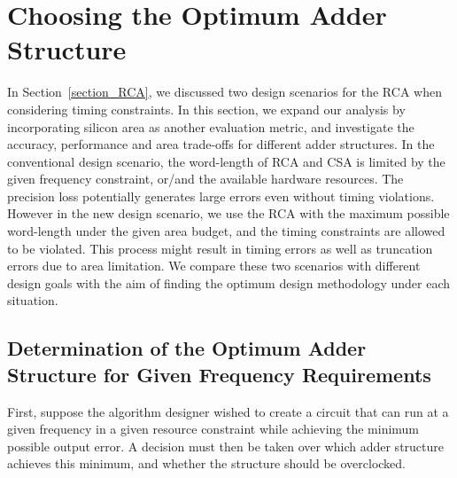\documentclass[prodmode,acmtrets]{acmsmall} %
\begin{document}
\section{Choosing the Optimum Adder Structure}\label{Section_OptimumAdder}
In Section~\ref{section_RCA}, we discussed two design scenarios for the RCA when considering timing constraints. In this section, we expand our analysis by incorporating silicon area as another evaluation metric, and investigate the accuracy, performance and area trade-offs for different adder structures. In the conventional design scenario, the word-length of RCA and CSA is limited by the given frequency constraint, or/and the available hardware resources. The precision loss potentially generates large errors even without timing violations. However in the new design scenario, we use the RCA with the maximum possible word-length under the given area budget, and the timing constraints are allowed to be violated. This process might result in timing errors as well as truncation errors due to area limitation. We compare these two scenarios with different design goals with the aim of finding the optimum design methodology under each situation.

\subsection{Determination of the Optimum Adder Structure for Given Frequency Requirements}
First, suppose the algorithm designer wished to create a circuit that can run at a given frequency in a given resource constraint while achieving the minimum possible output error. A decision must then be taken over which adder structure achieves this minimum, and whether the structure should be overclocked.


\end{document}
